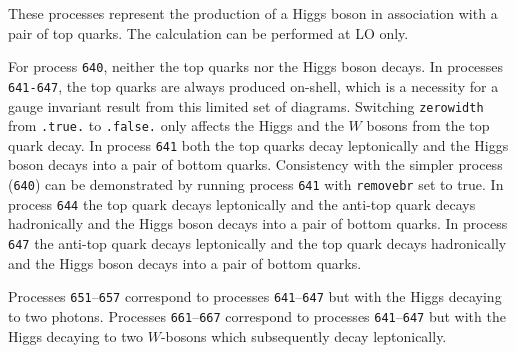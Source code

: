 \label{subsec:htt}

These processes represent the production of a Higgs boson in association
with a pair of top quarks. The calculation can be performed at LO only.

For process {\tt 640}, neither the top quarks nor the Higgs boson
decays.
In processes {\tt 641-647}, the top quarks are always
produced on-shell, which is a necessity for a gauge invariant result
from this limited set of diagrams.
Switching {\tt zerowidth} from {\tt .true.} to {\tt .false.} only affects
the Higgs and the $W$ bosons from the top quark decay.
In process {\tt 641} both the top quarks decay leptonically
and the Higgs boson decays into a pair of bottom quarks.
Consistency with
the simpler process ({\tt 640}) can be demonstrated by running process
{\tt 641} with {\tt removebr} set to true.
In process {\tt 644} the top quark decays leptonically
and the anti-top quark decays hadronically and the Higgs boson decays into a pair of bottom quarks.
In process {\tt 647} the anti-top quark decays leptonically
and the top quark decays hadronically and the Higgs boson decays into a pair of bottom quarks.

Processes {\tt 651}--{\tt 657} correspond to processes {\tt 641}--{\tt 647} but with the Higgs decaying
to two photons.
Processes {\tt 661}--{\tt 667} correspond to processes {\tt 641}--{\tt 647} but with the Higgs decaying
to two $W$-bosons which subsequently decay leptonically.
